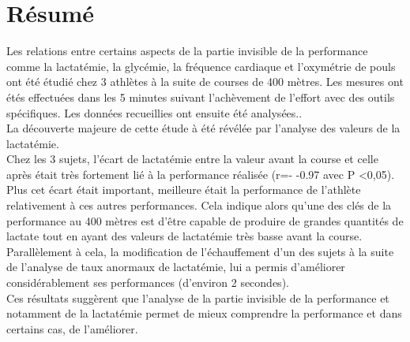 \chapter*{Résumé}
\label{chap:resume}



Les relations entre certains aspects de la partie invisible de la performance comme la lactatémie, la glycémie, la fréquence cardiaque et l'oxymétrie de pouls ont été étudié chez 3 athlètes à la suite de courses de 400 mètres. Les mesures ont étés effectuées dans les 5 minutes suivant l'achèvement de l'effort avec des outils spécifiques. Les données recueillies ont ensuite été analysées.. \\

La découverte majeure de cette étude à été révélée par l'analyse des valeurs de la lactatémie. \\

Chez les 3 sujets, l'écart de lactatémie entre la valeur avant la course et celle après était très fortement lié à la performance réalisée (r=-
-0.97 avec P <0,05). Plus cet écart était important, meilleure était la performance de l'athlète relativement à ces autres performances. Cela indique alors qu'une des clés de la performance au 400 mètres est d'être capable de produire de grandes quantités de lactate tout en ayant des valeurs de lactatémie très basse avant la course.\\

Parallèlement à cela, la modification de l'échauffement d'un des sujets à la suite de l'analyse de taux anormaux de lactatémie, lui a permis d'améliorer considérablement ses performances (d'environ 2 secondes).\\

Ces résultats suggèrent que l'analyse de la partie invisible de la performance et notamment de la lactatémie permet de mieux comprendre la performance et dans certains cas, de l'améliorer.

        
